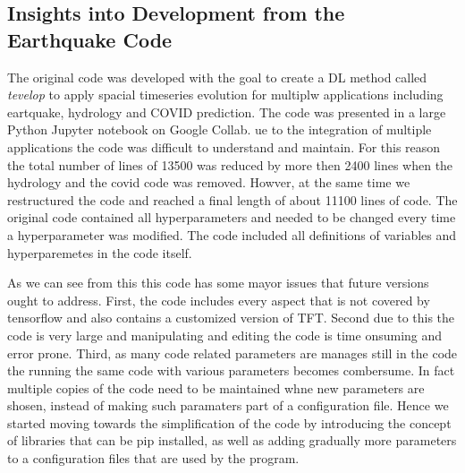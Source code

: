 \subsection{Insights into Development from the Earthquake Code}

The original code was developed with the goal to create a DL method
called {\em tevelop} to apply spacial timeseries evolution for
multiplw applications including eartquake, hydrology and COVID
prediction. The code was presented in a large Python Jupyter notebook
on Google Collab.  ue to the integration of multiple applications the
code was difficult to understand and maintain. For this reason the
total number of lines of 13500 was reduced by more then 2400 lines
when the hydrology and the covid code was removed.  Howver, at the
same time we restructured the code and reached a final length of about
11100 lines of code.  The original code contained all hyperparameters
and needed to be changed every time a hyperparameter was modified.
The code included all definitions of variables and hyperparemetes in
the code itself.

As we can see from this this code has some mayor issues that future
versions ought to address. First, the code includes every aspect that
is not covered by tensorflow and also contains a customized version of
TFT. Second due to this the code is very large and manipulating and
editing the code is time onsuming and error prone. Third, as many
code related parameters are manages still in the code the running the
same code with various parameters becomes combersume. In fact multiple
copies of the code need to be maintained whne new parameters are
shosen, instead of making such paramaters part of a configuration
file. Hence we started moving towards the simplification of the code
by introducing the concept of libraries that can be pip installed, as
well as adding gradually more parameters to a configuration files that
are used by the program.

